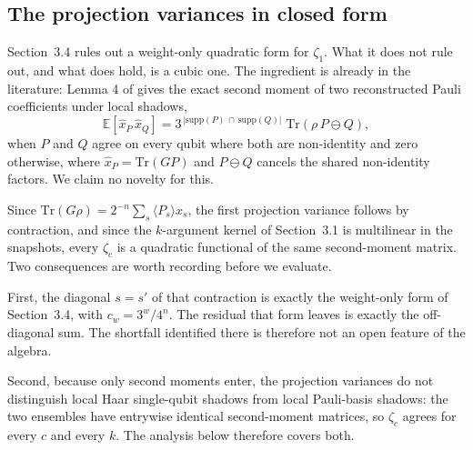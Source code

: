 
\subsection{The projection variances in closed form}
\label{sec:zeta-closed-form}

Section~3.4 rules out a weight-only quadratic form for \(\zeta_1\). What
it does not rule out, and what does hold, is a cubic one. The ingredient
is already in the literature: Lemma 4 of \cite{huang2020shadows} gives
the exact second moment of two reconstructed Pauli coefficients under
local shadows,
\[
\mathbb{E}\!\left[\hat x_{P}\, \hat x_{Q}\right]
= 3^{\,|\mathrm{supp}(P)\, \cap\, \mathrm{supp}(Q)|}\;
\mathrm{Tr}\!\left(\rho\, P\!\ominus\!Q\right),
\]
when \(P\) and \(Q\) agree on every qubit where both are non-identity and
zero otherwise, where \(\hat x_P = \mathrm{Tr}(G P)\) and \(P \ominus Q\)
cancels the shared non-identity factors. We claim no novelty for this.

Since \(\mathrm{Tr}(G\rho) = 2^{-n}\sum_s \langle P_s\rangle \hat x_s\),
the first projection variance follows by contraction, and since the
\(k\)-argument kernel of Section~3.1 is multilinear in the snapshots,
every \(\zeta_c\) is a quadratic functional of the same second-moment
matrix. Two consequences are worth recording before we evaluate.

First, the diagonal \(s = s'\) of that contraction is exactly the
weight-only form of Section~3.4, with \(c_w = 3^w/4^n\). The residual
that form leaves is exactly the off-diagonal sum. The shortfall
identified there is therefore not an open feature of the algebra.

Second, because only second moments enter, the projection variances do
not distinguish local Haar single-qubit shadows from local Pauli-basis
shadows: the two ensembles have entrywise identical second-moment
matrices, so \(\zeta_c\) agrees for every \(c\) and every \(k\). The
analysis below therefore covers both.

